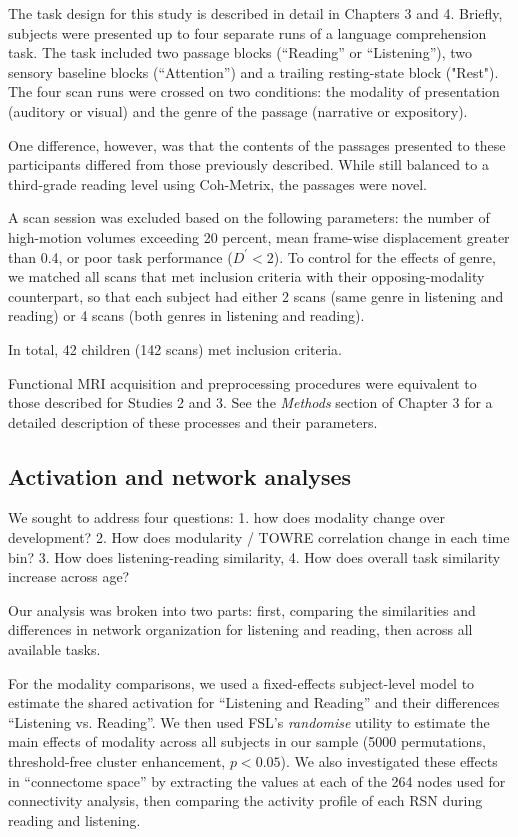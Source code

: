 The task design for this study is described in detail in Chapters 3 and 4. Briefly, subjects were presented up to four separate runs of a language comprehension task. The task included two passage blocks (``Reading'' or ``Listening''), two sensory baseline blocks (``Attention'') and a trailing resting-state block ("Rest"). The four scan runs were crossed on two conditions: the modality of presentation (auditory or visual) and the genre of the passage (narrative or expository). 

One difference, however, was that the contents of the passages presented to these participants differed from those previously described. While still balanced to a third-grade reading level using Coh-Metrix, the passages were novel. 

A scan session was excluded based on the following parameters: the number of high-motion volumes exceeding 20 percent, mean frame-wise displacement greater than 0.4, or poor task performance ($D^\prime < 2$). To control for the effects of genre, we matched all scans that met inclusion criteria with their opposing-modality counterpart, so that each subject had either 2 scans (same genre in listening and reading) or 4 scans (both genres in listening and reading). 

In total, 42 children (142 scans) met inclusion criteria.

Functional MRI acquisition and preprocessing procedures were equivalent to those described for Studies 2 and 3. See the \textit{Methods} section of Chapter 3 for a detailed description of these processes and their parameters.


\subsection{Activation and network analyses}

We sought to address four questions:
1. how does modality change over development?
2. How does modularity / TOWRE correlation change in each time bin?
3. How does listening-reading similarity, 
4. How does overall task similarity increase across age?

Our analysis was broken into two parts: first, comparing the similarities and differences in network organization for listening and reading, then across all available tasks. 

For the modality comparisons, we used a fixed-effects subject-level model to estimate the shared activation for ``Listening and Reading'' and their differences ``Listening vs. Reading''. We then used FSL's \textit{randomise} utility to estimate the main effects of modality across all subjects in our sample (5000 permutations, threshold-free cluster enhancement, $p < 0.05$).  We also investigated these effects in ``connectome space'' by extracting the values at each of the 264 nodes used for connectivity analysis, then comparing the activity profile of each RSN during reading and listening.

